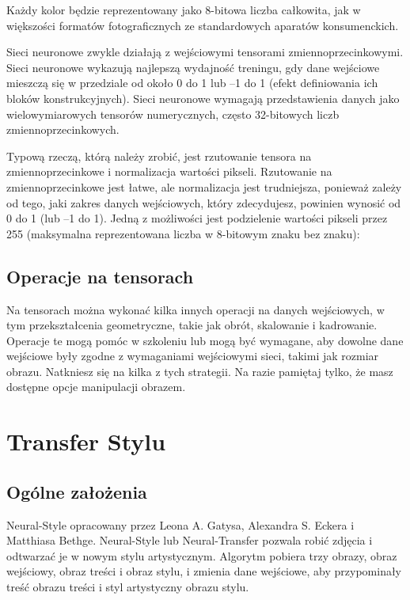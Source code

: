 \documentclass[brudnopis]{xmgr}
\begin{document}
Każdy kolor będzie reprezentowany jako 8-bitowa liczba całkowita, jak w większości formatów fotograficznych ze standardowych aparatów konsumenckich.

Sieci neuronowe zwykle działają z wejściowymi tensorami zmiennoprzecinkowymi. Sieci neuronowe wykazują najlepszą wydajność treningu, gdy dane wejściowe mieszczą się w przedziale od około 0 do 1 lub –1 do 1 (efekt definiowania ich bloków konstrukcyjnych). Sieci neuronowe wymagają przedstawienia danych jako wielowymiarowych tensorów numerycznych, często 32-bitowych liczb zmiennoprzecinkowych.


Typową rzeczą, którą należy zrobić, jest rzutowanie tensora na zmiennoprzecinkowe i normalizacja wartości pikseli. Rzutowanie na zmiennoprzecinkowe jest łatwe, ale normalizacja jest trudniejsza, ponieważ zależy od tego, jaki zakres danych wejściowych, który zdecydujesz, powinien wynosić od 0 do 1 (lub –1 do 1). Jedną z możliwości jest podzielenie wartości pikseli przez 255 (maksymalna reprezentowana liczba w 8-bitowym znaku bez znaku):

 \section{Operacje na tensorach\label{s:dsssl}}
Na tensorach można  wykonać kilka innych operacji na danych wejściowych, w tym przekształcenia geometryczne, takie jak obrót, skalowanie i kadrowanie. Operacje te mogą pomóc w szkoleniu lub mogą być wymagane, aby dowolne dane wejściowe były zgodne z wymaganiami wejściowymi sieci, takimi jak rozmiar obrazu. Natkniesz się na kilka z tych strategii. Na razie pamiętaj tylko, że masz dostępne opcje manipulacji obrazem.


\chapter{Transfer Stylu }

\section{Ogólne założenia\label{s:dsssl}}

Neural-Style opracowany przez Leona A. Gatysa, Alexandra S. Eckera i Matthiasa Bethge. Neural-Style lub Neural-Transfer pozwala robić zdjęcia i odtwarzać je w nowym stylu artystycznym. Algorytm pobiera trzy obrazy, obraz wejściowy, obraz treści i obraz stylu, i zmienia dane wejściowe, aby przypominały treść obrazu treści i styl artystyczny obrazu stylu.
\end{document}
